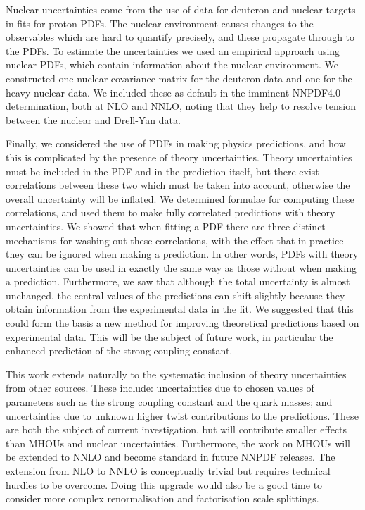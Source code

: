 Nuclear uncertainties come from the use of data for deuteron and nuclear targets in fits for proton PDFs. The nuclear environment causes changes to the observables which are hard to quantify precisely, and these propagate through to the PDFs. To estimate the uncertainties we used an empirical approach using nuclear PDFs, which contain information about the nuclear environment. We constructed one nuclear covariance matrix for the deuteron data and one for the heavy nuclear data. We included these as default in the imminent NNPDF4.0 determination, both at NLO and NNLO, noting that they help to resolve tension between the nuclear and Drell-Yan data. 

Finally, we considered the use of PDFs in making physics predictions, and how this is complicated by the presence of theory uncertainties. Theory uncertainties must be included in the PDF and in the prediction itself, but there exist correlations between these two which must be taken into account, otherwise the overall uncertainty will be inflated. We determined formulae for computing these correlations, and used them to make fully correlated predictions with theory uncertainties. We showed that when fitting a PDF there are three distinct mechanisms for washing out these correlations, with the effect that in practice they can be ignored when making a prediction. In other words, PDFs with theory uncertainties can be used in exactly the same way as those without when making a prediction. Furthermore, we saw that although the total uncertainty is almost unchanged, the central values of the predictions can shift slightly because they obtain information from the experimental data in the fit. We suggested that this could form the basis a new method for improving theoretical predictions based on experimental data. This will be the subject of future work, in particular the enhanced prediction of the strong coupling constant. 

This work extends naturally to the systematic inclusion of theory uncertainties from other sources. These include: uncertainties due to chosen values of parameters such as the strong coupling constant and the quark masses; and uncertainties due to unknown higher twist contributions to the predictions. These are both the subject of current investigation, but will contribute smaller effects than MHOUs and nuclear uncertainties. Furthermore, the work on MHOUs will be extended to NNLO and become standard in future NNPDF releases. The extension from NLO to NNLO is conceptually trivial but requires technical hurdles to be overcome. Doing this upgrade would also be a good time to consider more complex renormalisation and factorisation scale splittings. 